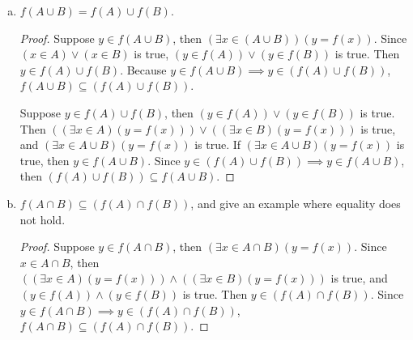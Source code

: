 \documentclass{article}
\begin{document}
\begin{enumerate}[(a)]
\begin{proof}
    Suppose $x \in f^{-1}(A) \setminus f^{-1}(B)$, then $\left( x \in f^{-1}(A) \right) \land \left( x \notin f^{-1}(B) \right)$. If $\left( x \in f^{-1}(A) \right) \land \left( x \notin f^{-1}(B) \right)$, then $\left( f(x) \in A \right) \land \left( f(x) \notin B \right)$ and $f(x) \in (A \setminus B)$. If $f(x) \in (A \setminus B)$, then $x \in f^{-1}(A \setminus B)$. Therefor if $x \in f^{-1}(A) \setminus f^{-1}(B) \implies x \in f^{-1}(A \setminus B)$, then $f^{-1}(A) \setminus f^{-1}(B) \subseteq f^{-1}(A \setminus B)$.
    \end{proof}
    
    \item $f(A \cup B) = f(A) \cup f(B)$.
    
    \begin{proof}
    Suppose $y \in f(A \cup B)$, then $\left( \exists x \in (A \cup B) \right) \left( y = f(x) \right)$. Since $(x \in A) \lor (x \in B)$ is true, $\left(y \in f(A)\right) \lor \left( y \in f(B) \right)$ is true. Then $y \in f(A) \cup f(B)$. Because $y \in f(A \cup B) \implies y \in \left( f(A) \cup f(B) \right)$, $f(A \cup B) \subseteq \left( f(A) \cup f(B) \right)$.
    
    Suppose $y \in f(A) \cup f(B)$, then $\left( y \in f(A) \right) \lor \left( y \in f(B) \right)$ is true. Then $\left( (\exists x \in A) \left( y = f(x) \right) \right) \lor \left( (\exists x \in B) \left( y = f(x) \right) \right)$ is true, and $(\exists x \in A \cup B) \left( y = f(x) \right)$ is true. If $(\exists x \in A \cup B) \left( y = f(x) \right)$ is true, then $y \in f(A \cup B)$. Since $y \in \left( f(A) \cup f(B) \right) \implies y \in f(A \cup B)$, then $\left( f(A) \cup f(B) \right) \subseteq f(A \cup B)$.
    \end{proof}
    
    \item $f(A \cap B) \subseteq \left( f(A) \cap f(B) \right)$, and give an example where equality does not hold.
    
    \begin{proof}
    Suppose $y \in f(A \cap B)$, then $(\exists x \in A \cap B) \left( y = f(x) \right)$. Since $x \in A \cap B$, then $\left( (\exists x \in A) \left( y = f(x) \right) \right) \land \left( (\exists x \in B) \left( y = f(x) \right) \right)$ is true, and $\left( y \in f(A) \right) \land \left( y \in f(B) \right)$ is true. Then $y \in \left( f(A) \cap f(B) \right)$. Since $y \in f(A \cap B) \implies y \in \left( f(A) \cap f(B) \right)$, $f(A \cap B) \subseteq \left( f(A) \cap f(B) \right)$.
    \end{proof}
    

\end{enumerate}
\end{document}
